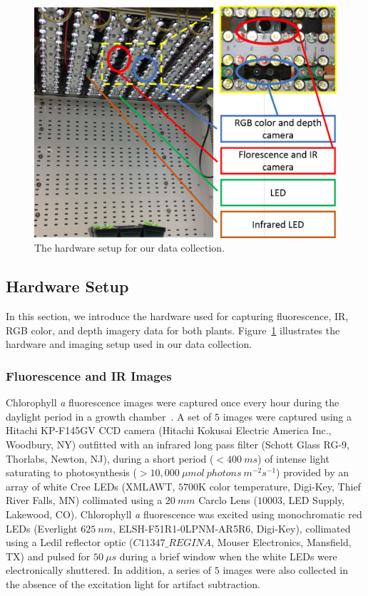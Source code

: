 \begin{figure}
  \includegraphics[width=0.95\linewidth]{Figures/hardware}
\caption{The hardware setup for our data collection.}
\label{fig:hardware}
\end{figure}

\subsection{Hardware Setup}

In this section, we introduce the hardware used for capturing fluorescence, IR, RGB color, and depth imagery data for both plants.
Figure~\ref{fig:hardware} illustrates the hardware and imaging setup used in our data collection.

\subsubsection{Fluorescence and IR Images}
Chlorophyll {\it a} fluorescence images were captured once every hour during the daylight period in a growth chamber~\cite{cruz2015depi}.
A set of $5$ images were captured using a Hitachi KP-F145GV CCD camera (Hitachi Kokusai Electric America Inc., Woodbury, NY) outfitted with an infrared long pass filter (Schott Glass RG-$9$, Thorlabs, Newton, NJ), during a short period ($<400~ms$) of intense light saturating to photosynthesis ($>10,000~\mu mol~photons~m^{-2} s^{-1}$) provided by an array of white Cree LEDs (XMLAWT, $5700$K color temperature, Digi-Key, Thief River Falls, MN) collimated using a $20~mm$ Carclo Lens ($10003$, LED Supply, Lakewood, CO).
%
Chlorophyll {\it a} fluorescence was excited using monochromatic red LEDs (Everlight $625~nm$, ELSH-F51R1-0LPNM-AR5R6, Digi-Key), collimated using a Ledil reflector optic ($C11347\_REGINA$, Mouser Electronics, Mansfield, TX) and pulsed for $50~\mu s$ during a brief window when the white LEDs were electronically shuttered.
In addition, a series of $5$ images were also collected in the absence of the excitation light for artifact subtraction.

